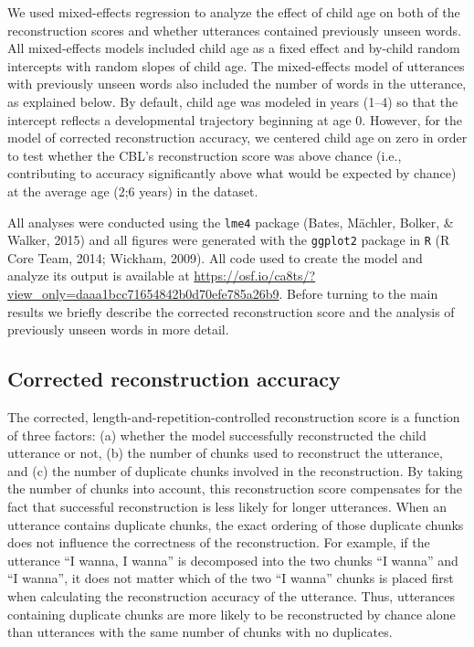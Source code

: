 \documentclass[man,mask,floatsintext]{apa6}
\theoremstyle{definition}
\theoremstyle{definition}
\theoremstyle{definition}
\theoremstyle{remark}
\begin{document}
We used mixed-effects regression to analyze the effect of child age on
both of the reconstruction scores and whether utterances contained
previously unseen words. All mixed-effects models included child age as
a fixed effect and by-child random intercepts with random slopes of
child age. The mixed-effects model of utterances with previously unseen
words also included the number of words in the utterance, as explained
below. By default, child age was modeled in years (1--4) so that the
intercept reflects a developmental trajectory beginning at age 0.
However, for the model of corrected reconstruction accuracy, we centered
child age on zero in order to test whether the CBL's reconstruction
score was above chance (i.e., contributing to accuracy significantly
above what would be expected by chance) at the average age (2;6 years)
in the dataset.

All analyses were conducted using the \texttt{lme4} package (Bates,
Mächler, Bolker, \& Walker, 2015) and all figures were generated with
the \texttt{ggplot2} package in \texttt{R} (R Core Team, 2014; Wickham,
2009). All code used to create the model and analyze its output is
available at
\href{}{https://osf.io/ca8ts/?view\_only=daaa1bcc71654842b0d70efe785a26b9}.
Before turning to the main results we briefly describe the corrected
reconstruction score and the analysis of previously unseen words in more
detail.

\subsection{Corrected reconstruction
accuracy}\label{corrected-reconstruction-accuracy}

The corrected, length-and-repetition-controlled reconstruction score is
a function of three factors: (a) whether the model successfully
reconstructed the child utterance or not, (b) the number of chunks used
to reconstruct the utterance, and (c) the number of duplicate chunks
involved in the reconstruction. By taking the number of chunks into
account, this reconstruction score compensates for the fact that
successful reconstruction is less likely for longer utterances. When an
utterance contains duplicate chunks, the exact ordering of those
duplicate chunks does not influence the correctness of the
reconstruction. For example, if the utterance \enquote{I wanna, I wanna}
is decomposed into the two chunks \enquote{I wanna} and \enquote{I
wanna}, it does not matter which of the two \enquote{I wanna} chunks is
placed first when calculating the reconstruction accuracy of the
utterance. Thus, utterances containing duplicate chunks are more likely
to be reconstructed by chance alone than utterances with the same number
of chunks with no duplicates.
\end{document}
